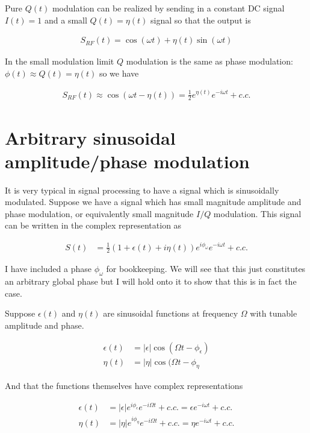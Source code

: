 \documentclass[12pt]{article}
\newcommand{\ep}{\epsilon}
\begin{document}
Pure $Q(t)$ modulation can be realized by sending in a constant DC signal $I(t)=1$ and a small $Q(t) = \eta(t)$ signal so that the output is

\begin{align}
S_{RF}(t) = \cos(\omega t) + \eta(t)\sin(\omega t)
\end{align}

In the small modulation limit $Q$ modulation is the same as phase modulation: $\phi(t) \approx Q(t) = \eta(t)$ so we have

\begin{align}
S_{RF}(t) \approx \cos(\omega t - \eta(t)) = \frac{1}{2}e^{\eta(t)}e^{-i\omega t} + c.c.
\end{align}



\section{Arbitrary sinusoidal amplitude/phase modulation}

It is very typical in signal processing to have a signal which is sinusoidally modulated. Suppose we have a signal which has small magnitude amplitude and phase modulation, or equivalently small magnitude $I/Q$ modulation. This signal can be written in the complex representation as 

\begin{align}
S(t) &= \frac{1}{2}(1 + \ep(t) + i\eta(t))e^{i\phi_{\omega}}e^{-i\omega t} + c.c.
\end{align} 

I have included a phase $\phi_{\omega}$ for bookkeeping. We will see that this just constitutes an arbitrary global phase but I will hold onto it to show that this is in fact the case.

Suppose $\ep(t)$ and $\eta(t)$ are sinusoidal functions at frequency $\Omega$ with tunable amplitude and phase.

\begin{align}
\ep(t) &= |\ep|\cos(\Omega t - \phi_{\ep})\\
\eta(t) &= |\eta|\cos(\Omega t - \phi_{\eta}
\end{align}

And that the functions themselves have complex representations

\begin{align}
\ep(t) &= |\ep|e^{i\phi_{\ep}}e^{-i\Omega t} + c.c. = \ep e^{-i\omega t} + c.c.\\
\eta(t) &= |\eta|e^{i\phi_{\eta}}e^{-i\Omega t} + c.c. = \eta e^{-i\omega t} + c.c.
\end{align}
\end{document}
